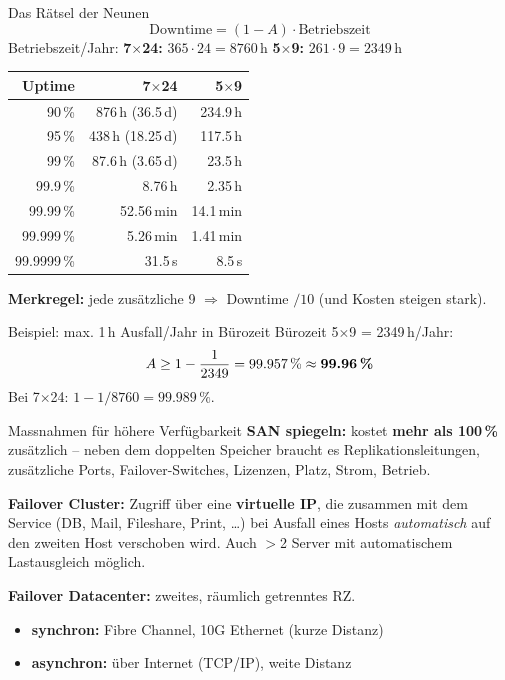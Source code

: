 \documentclass[a4paper, fontsize=7pt]{scrartcl}
\renewcommand*{\arraystretch}{1.5}  %
\begin{document}
\begin{mainbox}{Das Rätsel der Neunen}
$$\boxed{\text{Downtime} = (1 - A) \cdot \text{Betriebszeit}}$$
Betriebszeit/Jahr: \textbf{7$\times$24:} $365 \cdot 24 = 8760$\,h \quad
\textbf{5$\times$9:} $261 \cdot 9 = 2349$\,h
\renewcommand*{\arraystretch}{1.15}
\begin{center}
\begin{tabular}{r|r|r}
\textbf{Uptime} & \textbf{7$\times$24} & \textbf{5$\times$9} \\
\hline
90\,\% & 876\,h (36.5\,d) & 234.9\,h \\
95\,\% & 438\,h (18.25\,d) & 117.5\,h \\
99\,\% & 87.6\,h (3.65\,d) & 23.5\,h \\
99.9\,\% & 8.76\,h & 2.35\,h \\
99.99\,\% & 52.56\,min & 14.1\,min \\
99.999\,\% & 5.26\,min & 1.41\,min \\
99.9999\,\% & 31.5\,s & 8.5\,s \\
\end{tabular}
\end{center}
\textbf{Merkregel:} jede zusätzliche 9 $\Rightarrow$ Downtime $/10$
(und Kosten steigen stark).
\end{mainbox}

\begin{subbox}{Beispiel: max. 1\,h Ausfall/Jahr in Bürozeit}
Bürozeit 5$\times$9 = 2349\,h/Jahr:
$$A \geq 1 - \frac{1}{2349} = 99.957\,\% \approx \textbf{99.96\,\%}$$
Bei 7$\times$24: $1 - 1/8760 = 99.989\,\%$.
\end{subbox}

\begin{mainbox}{Massnahmen für höhere Verfügbarkeit}
\textbf{SAN spiegeln:} kostet \textbf{mehr als 100\,\%} zusätzlich -- neben dem
doppelten Speicher braucht es Replikationsleitungen, zusätzliche Ports,
Failover-Switches, Lizenzen, Platz, Strom, Betrieb.

\textbf{Failover Cluster:} Zugriff über eine \textbf{virtuelle IP}, die zusammen
mit dem Service (DB, Mail, Fileshare, Print, \dots) bei Ausfall eines Hosts
\emph{automatisch} auf den zweiten Host verschoben wird. Auch $>$2 Server mit
automatischem Lastausgleich möglich.

\textbf{Failover Datacenter:} zweites, räumlich getrenntes RZ.
\begin{itemize}
    \item \textbf{synchron:} Fibre Channel, 10G Ethernet (kurze Distanz)
    \item \textbf{asynchron:} über Internet (TCP/IP), weite Distanz
\end{itemize}
\end{mainbox}
\end{document}
